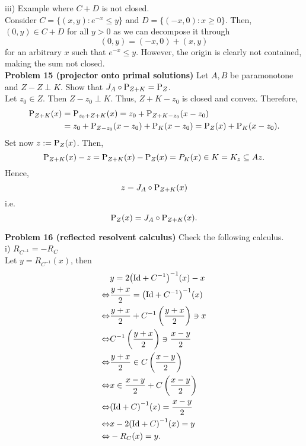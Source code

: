 \documentclass{scrartcl}
\newcommand{\sub}{\subseteq}
\theoremstyle{plain}
\theoremstyle{remark}
\newcommand{\Id}{\textup{Id}}
\renewcommand{\P}{\textup{P}}
\begin{document}
iii) Example where $C+D$ is not closed.\\
Consider $C=\{(x,y) : e^{-x} \le y\}$ and $D = \{(-x,0) : x \ge 0\}$. Then, $(0, y) \in C+D$ for all $y>0$ as we can decompose it through
\begin{equation}
  (0, y) = (-x, 0) + (x, y)
\end{equation}
for an arbitrary $x$ such that $e^{-x} \le y$. However, the origin is clearly not contained, making the sum not closed.\\

\textbf{Problem 15 (projector onto primal solutions)} Let $A,B$ be paramonotone and $Z-Z \perp K$. Show that $J_A \circ \P_{Z+K} = \P_Z$.\\
Let $z_0 \in Z$. Then $Z-z_0 \perp K$. Thus, $Z+K -z_0$ is closed and convex.
Therefore,
\begin{equation}
  \begin{aligned}
    \P_{Z+K}(x) &= \P_{z_0+ Z+K}(x) = z_0 + \P_{Z+K-z_0}(x-z_0) \\
    &= z_0 + \P_{Z-z_0}(x-z_0) + \P_{K}(x-z_0) = \P_Z(x) + \P_K(x-z_0).
  \end{aligned}
\end{equation}
Set now $z := \P_Z(x)$.
Then,
\begin{equation}
  \P_{Z+K}(x) - z = \P_{Z+K}(x) - \P_Z(x) = P_K(x) \in K = K_z \sub Az.
\end{equation}
Hence,
\begin{equation}
  z = J_A \circ \P_{Z+K}(x)
\end{equation}
i.e.
\begin{equation}
  \P_Z(x) = J_A \circ \P_{Z+K}(x).
\end{equation}


\textbf{Problem 16 (reflected resolvent calculus)} Check the following calculus. \\
i) $R_{C^{-1}} = - R_{C}$ \\
Let $y = R_{C^{-1}}(x)$, then
\begin{equation}
  \begin{aligned}
    &y = 2{\left(\Id + C^{-1}\right)}^{-1}(x) - x \\
    \Leftrightarrow& \frac{y+x}{2} = {\left(\Id + C^{-1}\right)}^{-1}(x) \\
    \Leftrightarrow& \frac{y+x}{2} + C^{-1}\left(\frac{y+x}{2}\right) \ni x \\
    \Leftrightarrow& C^{-1}\left(\frac{y+x}{2}\right) \ni \frac{x-y}{2} \\
    \Leftrightarrow& \frac{y+x}{2} \in  C \left( \frac{x-y}{2} \right) \\
    \Leftrightarrow& x \in \frac{x-y}{2} + C \left( \frac{x-y}{2} \right) \\
    \Leftrightarrow& {(\Id + C)}^{-1}(x) = \frac{x-y}{2} \\
    \Leftrightarrow& x-2{(\Id + C)}^{-1}(x) = y \\
    \Leftrightarrow& -R_{C}(x) = y.
  \end{aligned}
\end{equation}
\end{document}
